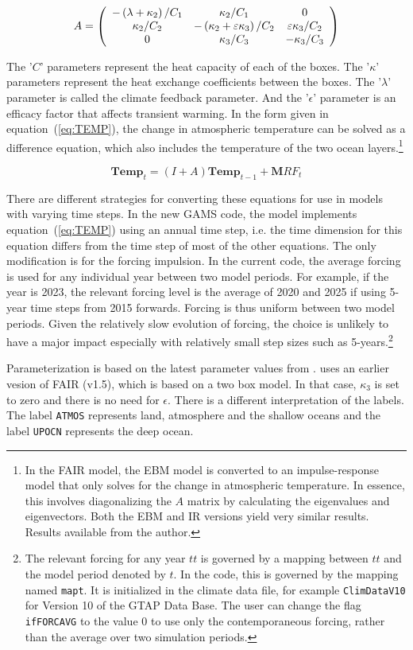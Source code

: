 \[
A = \left( \begin{array}{c c c }
-\left(\lambda+\kappa_2\right)/C_1 & \kappa_2/C_1 & 0 \\
\kappa_2/C_2 & -\left(\kappa_2 +\varepsilon \kappa_3\right)/C_2 &
\varepsilon \kappa_3/C_2 \\
0 & \kappa_3/C_3 & - \kappa_3/C_3 \\
\end{array} \right)
\]

The '$C$' parameters represent the heat capacity of each of the
boxes. The '$\kappa$' parameters represent the heat exchange
coefficients between the boxes. The '$\lambda$' parameter is called
the climate feedback parameter. And the '$\epsilon$' parameter
is an efficacy factor that affects transient warming. In the
form given in equation~(\ref{eq:TEMP}), the change in atmospheric temperature
can be solved as a difference equation, which also includes
the temperature of the two ocean layers.\footnote{In the FAIR model, the EBM model
is converted to an impulse-response model that only solves for the change
in atmospheric temperature. In essence, this involves diagonalizing
the $A$ matrix by calculating the eigenvalues and eigenvectors. Both
the EBM and IR versions yield very similar results. Results available
from the author.}

\begin{equation}
\label{eq:TEMP}
\mathbf{Temp}_t = (I+A)\mathbf{Temp}_{t-1} + \mathbf{M} \mathit{RF}_t
\end{equation}

There are different strategies for converting
these equations for use in models with varying time
steps. In the new GAMS code, the model
implements equation~(\ref{eq:TEMP}) using an annual time step,
i.e. the time dimension for this
equation differs from the time step
of most of the other equations. The only modification
is for the forcing impulsion. In the current
code, the average forcing is used for any individual
year between two model periods. For example, if
the year is 2023, the relevant forcing level
is the average of 2020 and 2025 if using
5-year time steps from 2015 forwards. Forcing is
thus uniform between two model periods. Given
the relatively slow evolution of forcing, the
choice is unlikely to have a major impact
especially with relatively small step sizes such
as 5-years.\footnote{The relevant forcing
for any year $\mathit{tt}$ is governed by a mapping
between $\mathit{tt}$ and the model period denoted
by $t$. In the code, this is governed by the mapping named \texttt{mapt}.
It is initialized in the climate data file, for
example \texttt{ClimDataV10} for Version 10
of the GTAP Data Base. The user can
change the flag \texttt{ifFORCAVG} to the
value 0 to use only the contemporaneous
forcing, rather than the average over two
simulation periods.}

Parameterization is based on the latest parameter
values from \cite{LeachetalFAIR2_0GeoModDev2020}.
\cite{Haensel2020} uses an earlier vesion
of FAIR (v1.5), which is based on a two
box model. In that case, $\kappa_3$ is set to zero
and there is no need for $\epsilon$. There is
a different interpretation of the labels. The
label \texttt{ATMOS} represents land, atmosphere and
the shallow oceans and the label \texttt{UPOCN} represents
the deep ocean.
